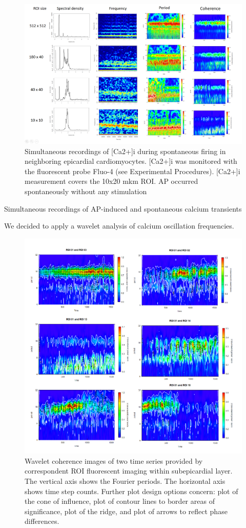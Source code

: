 \documentclass{biophys-new}
\begin{document}
\begin{figure}[hbt!]
\centering
\includegraphics[width=0.9\linewidth]{fig7.png}
\caption{Simultaneous recordings of [Ca2+]i during spontaneous firing in neighboring epicardial cardiomyocytes. [Ca2+]i was monitored with the fluorescent probe Fluo-4 (see Experimental Procedures). [Ca2+]i measurement covers the 10x20 mkm ROI. AP occurred spontaneously without any stimulation}
\label{fig:fig7}
\end{figure}


Simultaneous recordings of AP-induced and spontaneous calcium transients


We decided to apply a wavelet analysis of calcium oscillation frequencies. \cite{addison2018introduction}

\begin{figure}[hbt!]
\centering
\includegraphics[width=0.8\linewidth]{fig8.png}
\caption{Wavelet coherence images of two time series provided by correspondent ROI fluorescent imaging within subepicardial layer.
The vertical axis shows the Fourier periods. The horizontal axis shows time step counts.
Further plot design options concern: plot of the cone of influence, plot of contour lines to border areas of significance, plot of the ridge, and plot of arrows to reflect phase differences.}
\label{fig:fig8}
\end{figure}
\end{document}
